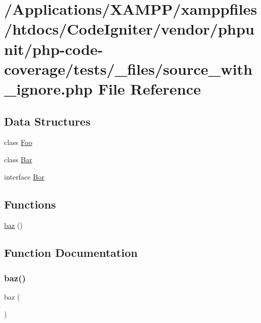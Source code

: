 \hypertarget{source__with__ignore_8php}{}\section{/\+Applications/\+X\+A\+M\+P\+P/xamppfiles/htdocs/\+Code\+Igniter/vendor/phpunit/php-\/code-\/coverage/tests/\+\_\+files/source\+\_\+with\+\_\+ignore.php File Reference}
\label{source__with__ignore_8php}
\subsection*{Data Structures}
\begin{DoxyCompactItemize}
\item 
class \mbox{\hyperlink{class_foo}{Foo}}
\item 
class \mbox{\hyperlink{class_bar}{Bar}}
\item 
interface \mbox{\hyperlink{interface_bor}{Bor}}
\end{DoxyCompactItemize}
\subsection*{Functions}
\begin{DoxyCompactItemize}
\item 
\mbox{\hyperlink{source__with__ignore_8php_ae7a58e6eb64e3fa0d88ff421f558d8f4}{baz}} ()
\end{DoxyCompactItemize}


\subsection{Function Documentation}
\mbox{\label{source__with__ignore_8php_ae7a58e6eb64e3fa0d88ff421f558d8f4}} 
\subsubsection{\texorpdfstring{baz()}{baz()}}
{\footnotesize\ttfamily baz (\begin{DoxyParamCaption}{ }\end{DoxyParamCaption})}


